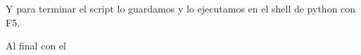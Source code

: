 \documentclass[letterpaper, 12pt, oneside]{article}
\begin{document}
\begin{enumerate}
\begin{enumerate}
			Y para terminar el script lo guardamos y lo ejecutamos en el shell de python con F5.
			
			Al final con el 
		\end{enumerate}
	\end{enumerate}
\end{document}
